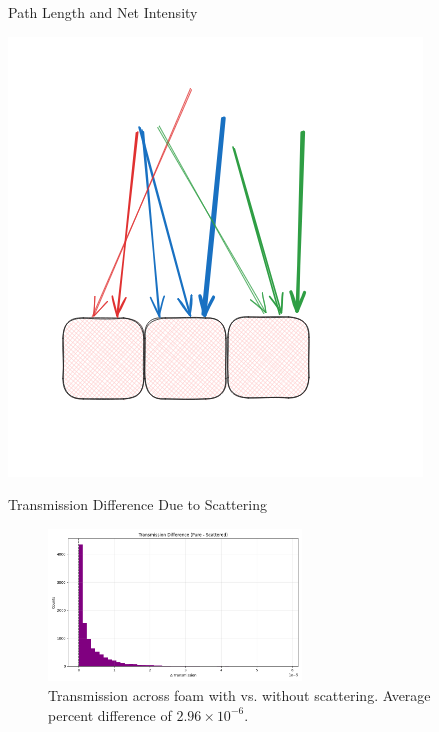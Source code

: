 \documentclass[aspectratio=169,xcolor=dvipsnames]{beamer}
\begin{document}
\begin{frame}{Path Length and Net Intensity}
\begin{center}
\begin{minipage}{0.4\textwidth}
  \centering
  \includegraphics[width=\linewidth]{netintensity.png}
\end{minipage}
\end{center}
\end{frame}



\begin{frame}{Transmission Difference Due to Scattering}
  \begin{figure}[h!]
    \centering
    \includegraphics[width=0.6\textwidth]{transmission_diff.png}
    \caption{Transmission across foam with vs. without scattering. Average percent difference of $2.96 \times10^{-6}$.}
  \end{figure}

\end{frame}
\end{document}
